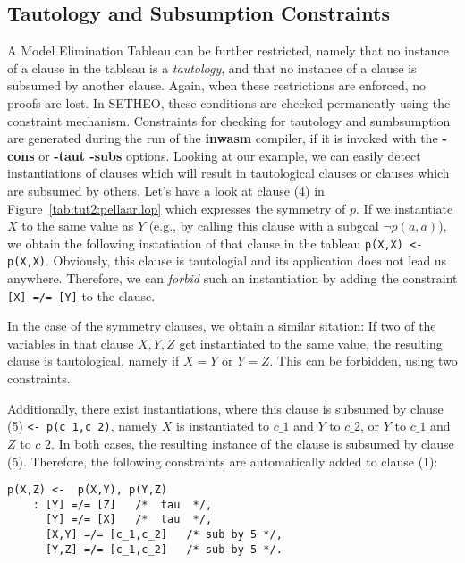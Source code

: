 \subsection{Tautology and Subsumption Constraints}

A Model Elimination Tableau can be further restricted, namely that
no instance of a clause in the tableau is a {\em tautology\/}, and
that no instance of a clause is subsumed by another clause.
Again, when these restrictions are enforced, no proofs are lost.
In SETHEO, these conditions are checked permanently using
the constraint mechanism. Constraints for checking for tautology and
sumbsumption are generated during the run of the {\bf inwasm} compiler,
if it is invoked with the {\bf -cons} or {\bf -taut -subs} options.
Looking at our example, we can easily detect instantiations of clauses
which will result in tautological clauses or clauses which are subsumed
by others. Let's have a look at clause (4) in 
Figure~\ref{tab:tut2:pellaar.lop} which expresses the symmetry of $p$.
If we instantiate $X$ to the same value as $Y$ (e.g., by calling this
clause with a subgoal $\neg p(a,a)$), we obtain the following
instatiation of that clause in the tableau
{\tt p(X,X) <- p(X,X)}. Obviously, this clause is tautologial and
its application does not lead us anywhere. Therefore, we can {\em forbid\/}
such an instantiation by adding the constraint {\tt [X] =/= [Y]}
to the clause.

In the case of the symmetry clauses, we obtain a similar sitation:
If two of the variables in that clause $X,Y,Z$ get instantiated to the
same value, the resulting clause is tautological, namely if
$X = Y$ or $Y = Z$. This can be forbidden, using two constraints.

Additionally, there exist instantiations, where this clause is subsumed
by clause (5) {\verb+<- p(c_1,c_2)+}, namely $X$ is instantiated
to $c\_1$ and $Y$ to $c\_2$, or $Y$ to $c\_1$ and $Z$ to $c\_2$.
In both cases, the resulting instance of the clause is subsumed by
clause (5).
Therefore, the following constraints are automatically added to
clause (1):

\begin{center}
\begin{verbatim}
p(X,Z) <-  p(X,Y), p(Y,Z)
	: [Y] =/= [Z]	/*  tau  */, 
	  [Y] =/= [X]	/*  tau  */, 
	  [X,Y] =/= [c_1,c_2]	/* sub by 5 */, 
	  [Y,Z] =/= [c_1,c_2]	/* sub by 5 */.
\end{verbatim}
\end{center}

